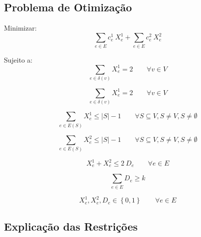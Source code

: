 \documentclass{article}
\newcommand{\Set}[1]{\ensuremath{\left\{#1\right\}}}
\newcommand{\Sum}[1]{\ensuremath{\displaystyle\sum\limits_{#1}}}
\newcommand{\abs}[1]{\ensuremath{\left| #1 \right|}}
\newcommand{\binary}{\ensuremath{\Set{0, 1}}}
\newcommand{\edge}{\ensuremath{e}}
\newcommand{\edges}{\ensuremath{E}}
\newcommand{\vertex}{\ensuremath{v}}
\newcommand{\vertices}{\ensuremath{V}}
\newcommand{\subvertices}{\ensuremath{S}}
\newcommand{\coe}{\ensuremath{c^{1}_{\edge}}}
\newcommand{\cte}{\ensuremath{c^{2}_{\edge}}}
\newcommand{\xoe}{\ensuremath{X^{1}_{\edge}}}
\newcommand{\xte}{\ensuremath{X^{2}_{\edge}}}
\newcommand{\de}{\ensuremath{D_{\edge}}}
\newcommand{\similarity}{\ensuremath{k}}
\begin{document}
\subsection{Problema de Otimização}

Minimizar:
\begin{equation}
    \label{eq:goal}
 	\Sum{\edge \in \edges} \coe \ \xoe
 	+
 	\Sum{\edge \in \edges} \cte \ \xte
\end{equation}

Sujeito a:
\begin{equation}
	\label{constraint:vertex presence in 1}
	\Sum{\edge \in \delta(\vertex)} \xoe = 2
	\qquad
	\forall \vertex \in \vertices
\end{equation}

\begin{equation}
	\label{constraint:vertex presence in 2}
	\Sum{\edge \in \delta(\vertex)} \xoe = 2
	\qquad
	\forall \vertex \in \vertices
\end{equation}

\begin{equation}
	\label{constraint:no subcycle 1}
	\Sum{\edge \in \edges(\subvertices)} \xoe \leq \abs{\subvertices} - 1
	\qquad
	\forall
		\subvertices \subseteq \vertices,
		\subvertices \neq \vertices,
		\subvertices \neq \emptyset
\end{equation}

\begin{equation}
	\label{constraint:no subcycle 2}
	\Sum{\edge \in \edges(\subvertices)} \xte \leq \abs{\subvertices} - 1
	\qquad
	\forall
		\subvertices \subseteq \vertices,
		\subvertices \neq \vertices,
		\subvertices \neq \emptyset
\end{equation}

\begin{equation}
	\label{constraint:similarity compatibility}
	\xoe + \xte \leq 2 \ \de
	\qquad
	\forall \edge \in \edges
\end{equation}

\begin{equation}
	\label{constraint:similarity}
	\Sum{\edge \in \edges} \de \geq \similarity
\end{equation}

\begin{equation}
	\label{constraint:binary variables}
	\xoe, \xte, \de \in \binary
	\qquad
	\forall \edge \in \edges
\end{equation}

\subsection{Explicação das Restrições}
\end{document}
